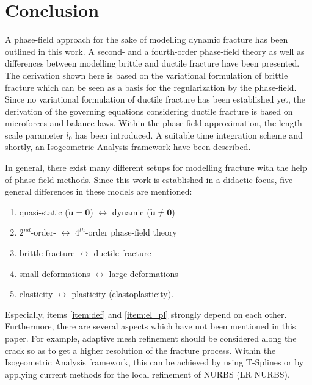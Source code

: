 \section{Conclusion} \label{sec:concl}
A phase-field approach for the sake of modelling dynamic fracture has been outlined in this work. A second- and a fourth-order phase-field theory as well as differences between modelling brittle and ductile fracture have been presented. The derivation shown here is based on the variational formulation of brittle fracture which can be seen as a basis for the regularization by the phase-field. Since no variational formulation of ductile fracture has been established yet, the derivation of the governing equations considering ductile fracture is based on microforces and balance laws.  Within the phase-field approximation, the length scale parameter $l_{0}$ has been introduced. A suitable time integration scheme and shortly, an Isogeometric Analysis framework have been described.

In general, there exist many different setups for modelling fracture with the help of phase-field methods. Since this work is established in a didactic focus, five general differences in these models are mentioned:
\begin{enumerate}
	\item quasi-static ($\ddot{\mathbf{u}}=\mathbf{0}$) $\leftrightarrow$  dynamic ($\ddot{\mathbf{u}}\neq\mathbf{0}$)
	\item $2^{nd}$-order- $\leftrightarrow$ $4^{th}$-order phase-field theory
	\item brittle fracture $\leftrightarrow$ ductile fracture
	\item\label{item:def} small deformations $\leftrightarrow$ large deformations
	\item\label{item:el_pl} elasticity $\leftrightarrow$ plasticity (elastoplasticity).
\end{enumerate}
Especially, items \ref{item:def} and \ref{item:el_pl} strongly depend on each other. Furthermore, there are several aspects which have not been mentioned in this paper. For example, adaptive mesh refinement should be considered along the crack so as to get a higher resolution of the fracture process. Within the Isogeometric Analysis framework, this can be achieved by using T-Splines or by applying current methods for the local refinement of NURBS (LR NURBS).

